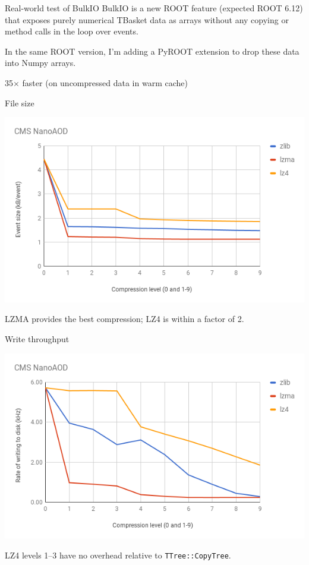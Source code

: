 \documentclass{beamer}
\begin{document}
\begin{frame}{Real-world test of BulkIO}
\vspace{0.5 cm}
BulkIO is a new ROOT feature (expected ROOT 6.12) that exposes purely numerical TBasket data as arrays without any copying or method calls in the loop over events.

\vspace{0.5 cm}
In the same ROOT version, I'm adding a PyROOT extension to drop these data into Numpy arrays.

35$\times$ faster (on uncompressed data in warm cache)

\end{frame}

\begin{frame}{File size}
\begin{center}
\includegraphics[width=\linewidth]{size-vs-compression.png}
\end{center}

LZMA provides the best compression; LZ4 is within a factor of 2.
\vspace{\baselineskip}
\end{frame}

\begin{frame}{Write throughput}
\begin{center}
\includegraphics[width=\linewidth]{write-vs-compression.png}
\end{center}

LZ4 levels 1--3 have no overhead relative to {\tt TTree::CopyTree}.
\vspace{\baselineskip}
\end{frame}
\end{document}
